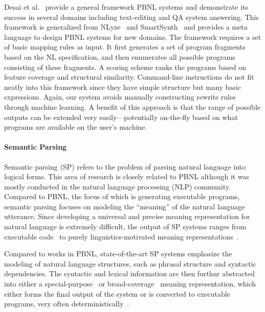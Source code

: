 Desai et al.~\cite{DBLP:journals/corr/DesaiGHJKMRR15} provide a general framework PBNL systems and demonstrate its success in several domains including text-editing and QA system answering. This framework is generalized from NLyze~\cite{DBLP:conf/sigmod/GulwaniM14} and SmartSynth~\cite{DBLP:conf/mobisys/LeGS13} and provides a meta language to design PBNL systems for new domains. The framework requires a set of basic mapping rules as input. It first generates a set of program fragments based on the NL specification, and then enumerates all possible programs consisting of these fragments. A scoring scheme ranks the programs based on feature coverage and structural similarity. Command-line instructions do not fit neatly into this framework since they have simple structure but many basic expressions. Again, our system avoids manually constructing rewrite rules through machine learning. A benefit of this approach is that the range of possible outputs can be extended very easily---potentially on-the-fly based on what programs are available on the user's machine.

\paragraph{Semantic Parsing} 
Semantic parsing (SP) refers to the problem of parsing natural language into logical forms. This area of research is closely related to PBNL although it was mostly conducted in the natural language processing (NLP) community. Compared to PBNL, the focus of which is generating executable programs, semantic parsing focuses on modeling the ``meaning'' of the natural language utterance. Since developing a universal and precise meaning representation for natural language is extremely difficult, the output of SP systems ranges from executable code~\cite{conf/iser/MatuszekHZF12} to purely linguistics-motivated meaning representations~\cite{lewis2015joint}.

Compared to works in PBNL, state-of-the-art SP systems emphasize the modeling of natural language structures, such as phrasal structure and syntactic dependencies. The syntactic and lexical information are then furthur abstracted into either a special-purpose~\cite{DBLP:conf/naacl/KushmanB13,DBLP:conf/acl/LeiLBR13} or broad-coverage~\cite{kwiatkowski-EtAl:2013:EMNLP} meaning representation, which either forms the final output of the system or is converted to executable programs, very often deterministically~\cite{DBLP:conf/naacl/KushmanB13,DBLP:conf/acl/LeiLBR13}.

